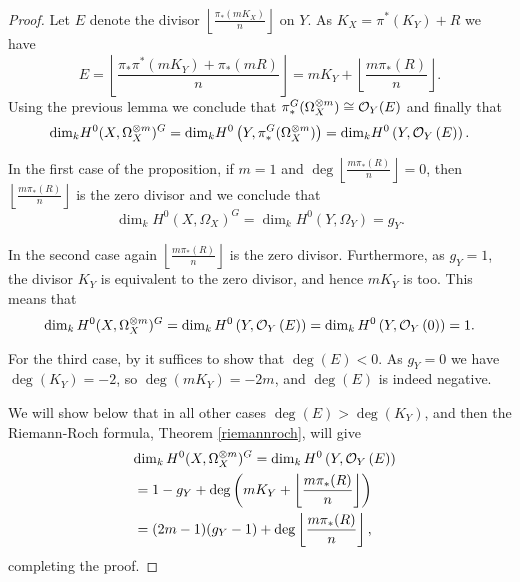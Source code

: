     \begin{proof}
    Let $E$ denote the divisor $\left\lfloor \frac{\pi_*(mK_X)}{n} \right\rfloor$ on $Y$. As $K_X=\pi^*(K_Y)+R$ we have
        \[ 
        E = 
        \left \lfloor \frac{\pi_*\pi^*(mK_Y) + \pi_*(mR)}{n} \right \rfloor =
        mK_Y + \left \lfloor \frac{m\pi_*(R)}{n} \right \rfloor.
        \]
    Using the previous lemma we conclude that $\pi_*^G(\Omega_X^{\otimes m}) \cong {\cal O}_Y (E)$ and finally that
        \begin{equation*}
        \textrm{dim}_k H^0(X,\Omega_X^{\otimes m})^G 
        = \textrm{dim}_k H^0\left(Y, \pi_*^G(\Omega_X^{\otimes m})\right)
        = \textrm{dim}_k H^0\left(Y, {\cal O}_Y\left( E \right) \right).
        \end{equation*}
    
    
    In the first case of the proposition, \ie if $m=1$ and $\deg \left\lfloor\frac{m\pi_*(R)}{n} \right\rfloor=0$, then $\left\lfloor\frac{m\pi_*(R)}{n} \right\rfloor$ is the zero divisor and we conclude that 
        \begin{equation*}
        \dim_kH^0(X,\Omega_X)^G = \dim_kH^0(Y, \Omega_Y) = g_Y.
        \end{equation*}
    
    
    In the second case again $\left\lfloor \frac{m\pi_*(R)}{n} \right\rfloor$ is the zero divisor. 
    Furthermore, as $g_Y=1$, the divisor $K_Y$ is equivalent to the zero divisor, and hence $mK_Y$ is too. 
    This means that
        \begin{equation*}
        \dim_kH^0(X,\Omega_X^{\otimes m})^G = \dim_kH^0\left( Y,{\cal O}_Y\left( E \right) \right) 
        = \dim_k  H^0\left( Y,{\cal O}_Y\left( 0 \right) \right)
        = 1.
        \end{equation*}
    
    
    For the third case, by \cite[Chap. IV, ex. 1.3.4]{hart} it suffices to show that $\deg \left( E \right) < 0$.
    As $g_Y=0$ we have $\deg(K_Y)=-2$, so $\deg(mK_Y)=-2m$, and $\deg \left( E \right)$ is indeed negative.
    
    
    
    We will show below that in all other cases $\deg(E) > \deg(K_Y)$, and then the Riemann-Roch formula, Theorem \ref{riemannroch}, will give 
        \begin{align*}
        \lefteqn{\dim_kH^0(X,\Omega_X^{\otimes m})^G = \dim_kH^0\left(Y,\cO_Y\left( E \right)\right)} \\
        & =  1-g_Y+\deg\left(mK_Y+\left\lfloor{\frac{m\pi_*(R)}{n}}\right\rfloor\right) \\
        & =  (2m-1)(g_Y-1)+\deg\left\lfloor{\frac{m\pi_*(R)}{n}}\right\rfloor,
        \end{align*}
    completing the proof.
    

\end{proof}
